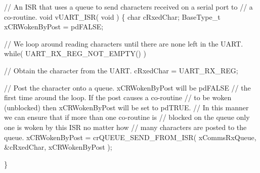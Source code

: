 \begin{DoxyPre}// An ISR that uses a queue to send characters received on a serial port to
// a co-routine.
void vUART\_ISR( void )
\{
char cRxedChar;
BaseType\_t xCRWokenByPost = pdFALSE;
\begin{DoxyVerb}// We loop around reading characters until there are none left in the UART.
while( UART_RX_REG_NOT_EMPTY() )
{
    // Obtain the character from the UART.
    cRxedChar = UART_RX_REG;

    // Post the character onto a queue.  xCRWokenByPost will be pdFALSE
    // the first time around the loop.  If the post causes a co-routine
    // to be woken (unblocked) then xCRWokenByPost will be set to pdTRUE.
    // In this manner we can ensure that if more than one co-routine is
    // blocked on the queue only one is woken by this ISR no matter how
    // many characters are posted to the queue.
    xCRWokenByPost = crQUEUE_SEND_FROM_ISR( xCommsRxQueue, &cRxedChar, xCRWokenByPost );
}
\end{DoxyVerb}

\}\end{DoxyPre}
 